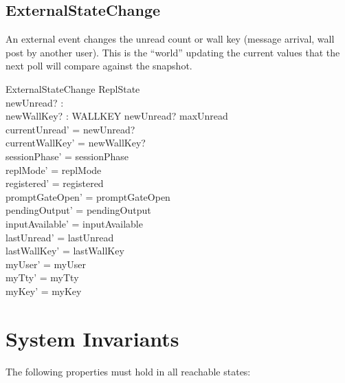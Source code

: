 \documentclass[a4paper,10pt,fleqn]{article}
\begin{document}
\subsection{ExternalStateChange}

An external event changes the unread count or wall key (message
arrival, wall post by another user).  This is the ``world'' updating
the current values that the next poll will compare against the
snapshot.

\begin{schema}{ExternalStateChange}
  \Delta ReplState \\
  newUnread? : \nat \\
  newWallKey? : WALLKEY
\where
  newUnread? \leq maxUnread \\
  currentUnread' = newUnread? \\
  currentWallKey' = newWallKey? \\
  sessionPhase' = sessionPhase \\
  replMode' = replMode \\
  registered' = registered \\
  promptGateOpen' = promptGateOpen \\
  pendingOutput' = pendingOutput \\
  inputAvailable' = inputAvailable \\
  lastUnread' = lastUnread \\
  lastWallKey' = lastWallKey \\
  myUser' = myUser \\
  myTty' = myTty \\
  myKey' = myKey
\end{schema}

\section{System Invariants}

The following properties must hold in all reachable states:
\end{document}
